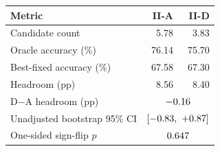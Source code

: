 \begin{tabular}{@{}lrr@{}}
\toprule
Metric & II-A & II-D \\
\midrule
Candidate count & 5.78 & 3.83 \\
Oracle accuracy (\%) & 76.14 & 75.70 \\
Best-fixed accuracy (\%) & 67.58 & 67.30 \\
Headroom (pp) & 8.56 & 8.40 \\
\midrule
D$-$A headroom (pp) & \multicolumn{2}{c}{$-0.16$} \\
Unadjusted bootstrap 95\% CI & \multicolumn{2}{c}{$[-0.83,\ +0.87]$} \\
One-sided sign-flip $p$ & \multicolumn{2}{c}{$0.647$} \\
\bottomrule
\end{tabular}
